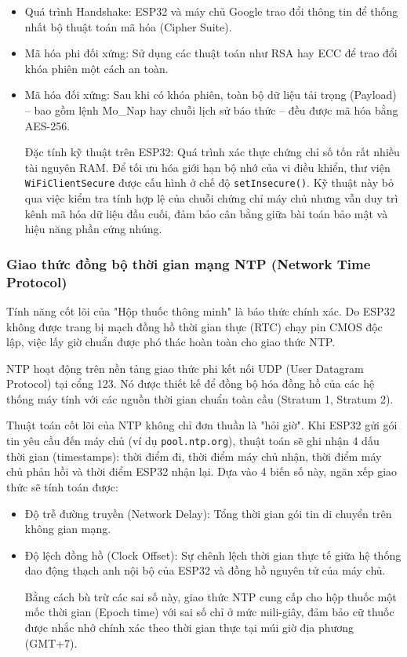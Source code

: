 \documentclass[12pt, a4paper, oneside]{article}
\begin{document}
\begin{itemize}
    \item Quá trình Handshake: ESP32 và máy chủ Google trao đổi thông tin để thống nhất bộ thuật toán mã hóa (Cipher Suite).
    \item Mã hóa phi đối xứng: Sử dụng các thuật toán như RSA hay ECC để trao đổi khóa phiên một cách an toàn.
    \item Mã hóa đối xứng: Sau khi có khóa phiên, toàn bộ dữ liệu tải trọng (Payload) – bao gồm lệnh Mo\_Nap hay chuỗi lịch sử báo thức – đều được mã hóa bằng AES-256.
    
    Đặc tính kỹ thuật trên ESP32: Quá trình xác thực chứng chỉ số tốn rất nhiều tài nguyên RAM. Để tối ưu hóa giới hạn bộ nhớ của vi điều khiển, thư viện \texttt{WiFiClientSecure} được cấu hình ở chế độ \texttt{setInsecure()}. Kỹ thuật này bỏ qua việc kiểm tra tính hợp lệ của chuỗi chứng chỉ máy chủ nhưng vẫn duy trì kênh mã hóa dữ liệu đầu cuối, đảm bảo cân bằng giữa bài toán bảo mật và hiệu năng phần cứng nhúng.
\end{itemize}

\subsubsection{Giao thức đồng bộ thời gian mạng NTP (Network Time Protocol)}

Tính năng cốt lõi của "Hộp thuốc thông minh" là báo thức chính xác. Do ESP32 không được trang bị mạch đồng hồ thời gian thực (RTC) chạy pin CMOS độc lập, việc lấy giờ chuẩn được phó thác hoàn toàn cho giao thức NTP.

NTP hoạt động trên nền tảng giao thức phi kết nối UDP (User Datagram Protocol) tại cổng 123. Nó được thiết kế để đồng bộ hóa đồng hồ của các hệ thống máy tính với các nguồn thời gian chuẩn toàn cầu (Stratum 1, Stratum 2).

Thuật toán cốt lõi của NTP không chỉ đơn thuần là "hỏi giờ". Khi ESP32 gửi gói tin yêu cầu đến máy chủ (ví dụ \texttt{pool.ntp.org}), thuật toán sẽ ghi nhận 4 dấu thời gian (timestamps): thời điểm đi, thời điểm máy chủ nhận, thời điểm máy chủ phản hồi và thời điểm ESP32 nhận lại. Dựa vào 4 biến số này, ngăn xếp giao thức sẽ tính toán được:

\begin{itemize}
    \item Độ trễ đường truyền (Network Delay): Tổng thời gian gói tin di chuyển trên không gian mạng.
    \item Độ lệch đồng hồ (Clock Offset): Sự chênh lệch thời gian thực tế giữa hệ thống dao động thạch anh nội bộ của ESP32 và đồng hồ nguyên tử của máy chủ.
    
Bằng cách bù trừ các sai số này, giao thức NTP cung cấp cho hộp thuốc một mốc thời gian (Epoch time) với sai số chỉ ở mức mili-giây, đảm bảo cữ thuốc được nhắc nhở chính xác theo thời gian thực tại múi giờ địa phương (GMT+7).
\end{itemize}
\end{document}
